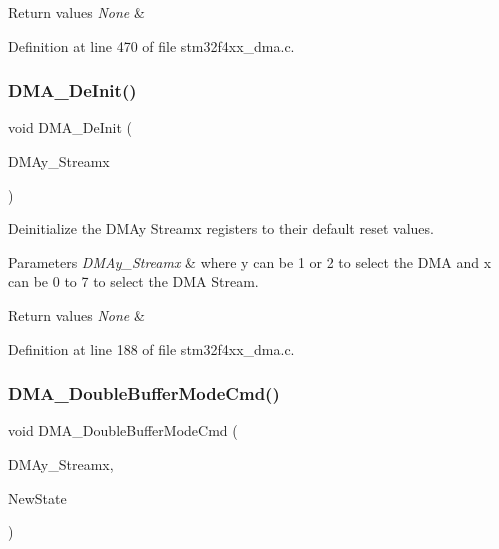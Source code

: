 \begin{DoxyRetVals}{Return values}
{\em None} & \\
\hline
\end{DoxyRetVals}


Definition at line 470 of file stm32f4xx\+\_\+dma.\+c.

\mbox{\label{group___d_m_a_ga38d4a4ab8990299f8a6cf064e1e811d0}} 
\subsubsection{\texorpdfstring{D\+M\+A\+\_\+\+De\+Init()}{DMA\_DeInit()}}
{\footnotesize\ttfamily void D\+M\+A\+\_\+\+De\+Init (\begin{DoxyParamCaption}\item[{\hyperlink{struct_d_m_a___stream___type_def}{D\+M\+A\+\_\+\+Stream\+\_\+\+Type\+Def} $\ast$}]{D\+M\+Ay\+\_\+\+Streamx }\end{DoxyParamCaption})}



Deinitialize the D\+M\+Ay Streamx registers to their default reset values. 


\begin{DoxyParams}{Parameters}
{\em D\+M\+Ay\+\_\+\+Streamx} & where y can be 1 or 2 to select the D\+MA and x can be 0 to 7 to select the D\+MA Stream. \\
\hline
\end{DoxyParams}

\begin{DoxyRetVals}{Return values}
{\em None} & \\
\hline
\end{DoxyRetVals}


Definition at line 188 of file stm32f4xx\+\_\+dma.\+c.

\mbox{\label{group___d_m_a_ga7fe09e62ea3125db384829dab59ebe3e}} 
\subsubsection{\texorpdfstring{D\+M\+A\+\_\+\+Double\+Buffer\+Mode\+Cmd()}{DMA\_DoubleBufferModeCmd()}}
{\footnotesize\ttfamily void D\+M\+A\+\_\+\+Double\+Buffer\+Mode\+Cmd (\begin{DoxyParamCaption}\item[{\hyperlink{struct_d_m_a___stream___type_def}{D\+M\+A\+\_\+\+Stream\+\_\+\+Type\+Def} $\ast$}]{D\+M\+Ay\+\_\+\+Streamx,  }\item[{Functional\+State}]{New\+State }\end{DoxyParamCaption})}



